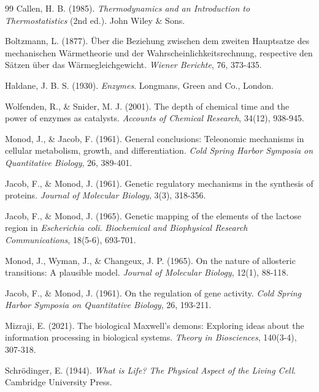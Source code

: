 \documentclass[11pt,a4paper]{article}
\begin{document}
\begin{thebibliography}{99}
Callen, H. B. (1985). \textit{Thermodynamics and an Introduction to Thermostatistics} (2nd ed.). John Wiley \& Sons.

Boltzmann, L. (1877). Über die Beziehung zwischen dem zweiten Hauptsatze des mechanischen Wärmetheorie und der Wahrscheinlichkeitsrechnung, respective den Sätzen über das Wärmegleichgewicht. \textit{Wiener Berichte}, 76, 373-435.

Haldane, J. B. S. (1930). \textit{Enzymes}. Longmans, Green and Co., London.

Wolfenden, R., \& Snider, M. J. (2001). The depth of chemical time and the power of enzymes as catalysts. \textit{Accounts of Chemical Research}, 34(12), 938-945.

Monod, J., \& Jacob, F. (1961). General conclusions: Teleonomic mechanisms in cellular metabolism, growth, and differentiation. \textit{Cold Spring Harbor Symposia on Quantitative Biology}, 26, 389-401.

Jacob, F., \& Monod, J. (1961). Genetic regulatory mechanisms in the synthesis of proteins. \textit{Journal of Molecular Biology}, 3(3), 318-356.

Jacob, F., \& Monod, J. (1965). Genetic mapping of the elements of the lactose region in \textit{Escherichia coli}. \textit{Biochemical and Biophysical Research Communications}, 18(5-6), 693-701.

Monod, J., Wyman, J., \& Changeux, J. P. (1965). On the nature of allosteric transitions: A plausible model. \textit{Journal of Molecular Biology}, 12(1), 88-118.

Jacob, F., \& Monod, J. (1961). On the regulation of gene activity. \textit{Cold Spring Harbor Symposia on Quantitative Biology}, 26, 193-211.

Mizraji, E. (2021). The biological Maxwell's demons: Exploring ideas about the information processing in biological systems. \textit{Theory in Biosciences}, 140(3-4), 307-318.

Schrödinger, E. (1944). \textit{What is Life? The Physical Aspect of the Living Cell}. Cambridge University Press.


\end{thebibliography}
\end{document}
